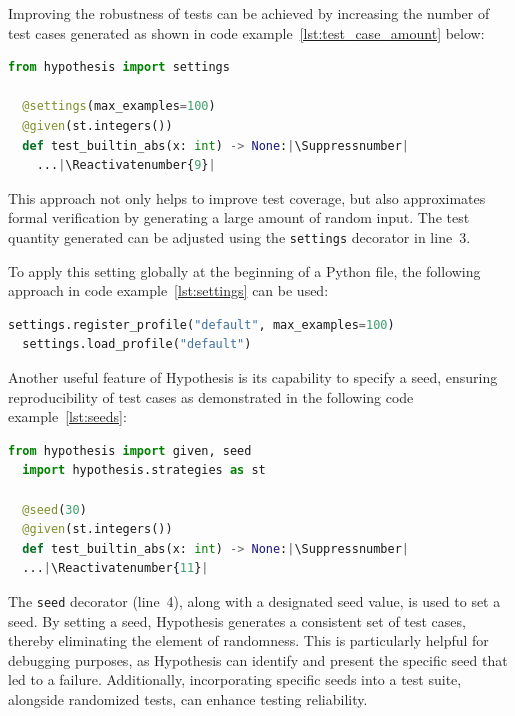 \documentclass[runningheads]{llncs}
\makeatletter
\let\origthelstnumber\thelstnumber
\newcommand*\Suppressnumber{%
  \lst@AddToHook{OnNewLine}{%
    \let\thelstnumber\relax%
     \advance\c@lstnumber-\@ne\relax%
    }%
}
\newcommand*\Reactivatenumber[1]{%
  \setcounter{lstnumber}{\numexpr#1-1\relax}
  \lst@AddToHook{OnNewLine}{%
   \let\thelstnumber\origthelstnumber%
   \refstepcounter{lstnumber}%
  }%
}
\makeatother
\begin{document}
\vspace{5mm}
\noindent Improving the robustness of tests can be achieved by increasing the number of test cases generated as shown in code example~\ref{lst:test_case_amount} below:

\begin{lstlisting}[language=Python,caption={Specifying Test Case Amount from \texttt{tutorial.ipynb}},label=lst:test_case_amount]
  from hypothesis import settings

  @settings(max_examples=100)
  @given(st.integers())
  def test_builtin_abs(x: int) -> None:|\Suppressnumber|
    ...|\Reactivatenumber{9}|

\end{lstlisting}
This approach not only helps to improve test coverage, but also approximates formal verification by generating a large amount of random input. The test quantity generated can be adjusted using the \texttt{settings} decorator in line~3.

To apply this setting globally at the beginning of a Python file, the following approach in code example~\ref{lst:settings} can be used:

\begin{lstlisting}[language=Python,caption={Global Settings from \texttt{tutorial.ipynb}},label=lst:settings]
  settings.register_profile("default", max_examples=100)
  settings.load_profile("default")
\end{lstlisting}

\vspace{5mm}
\noindent Another useful feature of Hypothesis is its capability to specify a seed, ensuring reproducibility of test cases as demonstrated in the following code example~\ref{lst:seeds}:

\begin{lstlisting}[language=Python,caption={Specifying Seeds from \texttt{tutorial.ipynb}},label=lst:seeds]
  from hypothesis import given, seed
  import hypothesis.strategies as st

  @seed(30)
  @given(st.integers())
  def test_builtin_abs(x: int) -> None:|\Suppressnumber|
  ...|\Reactivatenumber{11}|

\end{lstlisting}
The \texttt{seed} decorator (line~4), along with a designated seed value, is used to set a seed. By setting a seed, Hypothesis generates a consistent set of test cases, thereby eliminating the element of randomness. This is particularly helpful for debugging purposes, as Hypothesis can identify and present the specific seed that led to a failure. Additionally, incorporating specific seeds into a test suite, alongside randomized tests, can enhance testing reliability. 
\end{document}
